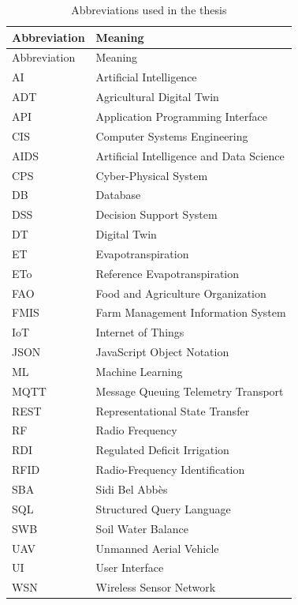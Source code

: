 \begin{footnotesize}
\setlength{\tabcolsep}{2pt}
\begin{longtable}{@{}>{\raggedright\arraybackslash}p{}>{\raggedright\arraybackslash}p{}@{}}
\caption{Abbreviations used in the thesis}\\
\toprule
Abbreviation & Meaning \\
\midrule
\endfirsthead
\toprule
Abbreviation & Meaning \\
\midrule
\endhead
AI & Artificial Intelligence \\
ADT & Agricultural Digital Twin \\
API & Application Programming Interface \\
CIS & Computer Systems Engineering \\
AIDS & Artificial Intelligence and Data Science \\
CPS & Cyber-Physical System \\
DB & Database \\
DSS & Decision Support System \\
DT & Digital Twin \\
ET & Evapotranspiration \\
ETo & Reference Evapotranspiration \\
FAO & Food and Agriculture Organization \\
FMIS & Farm Management Information System \\
IoT & Internet of Things \\
JSON & JavaScript Object Notation \\
ML & Machine Learning \\
MQTT & Message Queuing Telemetry Transport \\
REST & Representational State Transfer \\
RF & Radio Frequency \\
RDI & Regulated Deficit Irrigation \\
RFID & Radio-Frequency Identification \\
SBA & Sidi Bel Abbès \\
SQL & Structured Query Language \\
SWB & Soil Water Balance \\
UAV & Unmanned Aerial Vehicle \\
UI & User Interface \\
WSN & Wireless Sensor Network \\
\bottomrule
\end{longtable}
\end{footnotesize}

\cleardoublepage
\tableofcontents
\cleardoublepage
\listoffigures
\cleardoublepage
\listoftables
\cleardoublepage
